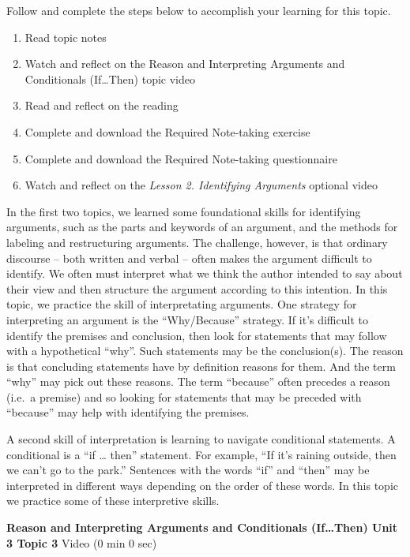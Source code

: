 \documentclass[
]{book}
\providecommand{\tightlist}{%
  \setlength{\itemsep}{0pt}\setlength{\parskip}{0pt}}
\begin{document}
Follow and complete the steps below to accomplish your learning for this topic.

\begin{enumerate}
\def\labelenumi{\arabic{enumi}.}
\tightlist
\item
  Read topic notes
\item
  Watch and reflect on the Reason and Interpreting Arguments and Conditionals (If\ldots Then) topic video
\item
  Read and reflect on the reading
\item
  Complete and download the Required Note-taking exercise
\item
  Complete and download the Required Note-taking questionnaire
\item
  Watch and reflect on the \emph{Lesson 2. Identifying Arguments} optional video
\end{enumerate}

In the first two topics, we learned some foundational skills for identifying arguments, such as the parts and keywords of an argument, and the methods for labeling and restructuring arguments. The challenge, however, is that ordinary discourse -- both written and verbal -- often makes the argument difficult to identify. We often must interpret what we think the author intended to say about their view and then structure the argument according to this intention. In this topic, we practice the skill of interpretating arguments. One strategy for interpreting an argument is the ``Why/Because'' strategy. If it's difficult to identify the premises and conclusion, then look for statements that may follow with a hypothetical ``why''. Such statements may be the conclusion(s). The reason is that concluding statements have by definition reasons for them. And the term ``why'' may pick out these reasons. The term ``because'' often precedes a reason (i.e.~a premise) and so looking for statements that may be preceded with ``because'' may help with identifying the premises.

A second skill of interpretation is learning to navigate conditional statements. A conditional is a ``if \ldots{} then'' statement. For example, ``If it's raining outside, then we can't go to the park.'' Sentences with the words ``if'' and ``then'' may be interpreted in different ways depending on the order of these words. In this topic we practice some of these interpretive skills.

\textbf{Reason and Interpreting Arguments and Conditionals (If\ldots Then) Unit 3 Topic 3} Video (0 min 0 sec)
\end{document}
